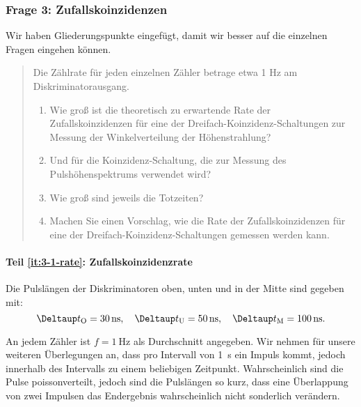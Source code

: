 \documentclass[11pt, ngerman, fleqn, DIV=15, headinclude, BCOR=2cm]{scrreprt}
\begin{document}

\subsubsection{Frage 3: Zufallskoinzidenzen}

Wir haben Gliederungspunkte eingefügt, damit wir besser auf die einzelnen
Fragen eingehen können.

\begin{quote}
    Die Zählrate für jeden einzelnen Zähler betrage etwa 1 Hz am
    Diskriminatorausgang.
    \begin{enumerate}
        \item
            \label{it:3-1-rate}
            Wie groß ist die theoretisch zu erwartende Rate der
            Zufallskoinzidenzen für eine der Dreifach-Koinzidenz-Schaltungen
            zur Messung der Winkelverteilung der Höhenstrahlung?

        \item
            \label{it:3-1-puls}
            Und für die Koinzidenz-Schaltung, die zur Messung des
            Pulshöhenspektrums verwendet wird?

        \item
            \label{it:3-1-tot}
            Wie groß sind jeweils die Totzeiten? 

        \item
            \label{it:3-1-vorschlag}
            Machen Sie einen Vorschlag, wie die Rate der Zufallskoinzidenzen
            für eine der Dreifach-Koinzidenz-Schaltungen gemessen werden kann.
    \end{enumerate}
\end{quote}

\paragraph{Teil \ref{it:3-1-rate}: Zufallskoinzidenzrate}

\newcommand\DtM{\Deltaup t_\text M}
\newcommand\DtO{\Deltaup t_\text O}
\newcommand\DtU{\Deltaup t_\text U}

Die Pulslängen der Diskriminatoren oben, unten und in der Mitte sind gegeben
mit:
\[
    \DtO = \SI{30}{\nano\second}
    \eqnsep
    \DtU = \SI{50}{\nano\second}
    \eqnsep
    \DtM = \SI{100}{\nano\second}.
\]

An jedem Zähler ist $f = \SI{1}{\hertz}$ als Durchschnitt angegeben. Wir nehmen
für unsere weiteren Überlegungen an, dass pro Intervall von \SI{1}{\second} ein
Impuls kommt, jedoch innerhalb des Intervalls zu einem beliebigen Zeitpunkt.
Wahrscheinlich sind die Pulse poissonverteilt, jedoch sind die Pulslängen so
kurz, dass eine Überlappung von zwei Impulsen das Endergebnis wahrscheinlich
nicht sonderlich verändern.
\end{document}
